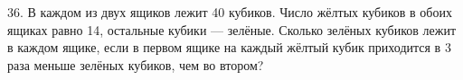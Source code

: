 36. В каждом из двух ящиков лежит 40 кубиков. Число жёлтых кубиков в обоих ящиках равно 14, остальные кубики --- зелёные. Сколько зелёных кубиков лежит в каждом ящике, если в первом ящике на каждый жёлтый кубик приходится в 3 раза меньше зелёных кубиков, чем во втором?\\
